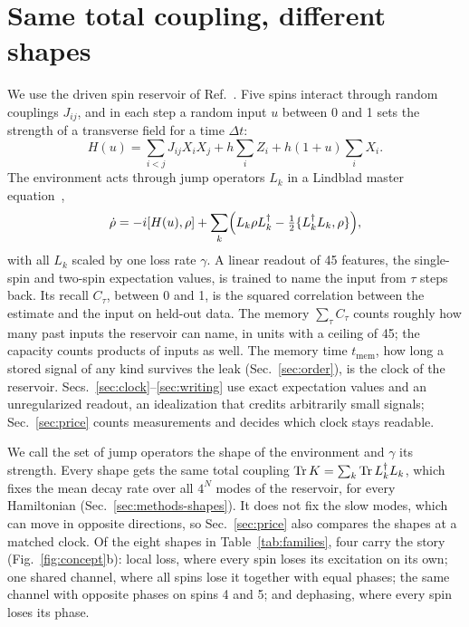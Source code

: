 \section{Same total coupling, different shapes}
\label{sec:shapes}
We use the driven spin reservoir of Ref.~\cite{Sannia2024}. Five spins interact through random couplings $J_{ij}$,
and in each step a random input $u$ between 0 and 1 sets the strength of a transverse field for a time $\Delta t$:
\begin{equation}
  H(u)=\sum_{i<j}J_{ij}X_iX_j+h\sum_iZ_i+h(1+u)\sum_iX_i .
  \label{eq:H}
\end{equation}
The environment acts through jump operators $L_k$ in a Lindblad master equation~\cite{Gorini1976,Lindblad1976},
\begin{equation}
  \dot\rho=-i[H(u),\rho]+\sum_k\Bigl(L_k\rho L_k^\dagger-\tfrac12\{L_k^\dagger L_k,\rho\}\Bigr),
  \label{eq:lindblad}
\end{equation}
with all $L_k$ scaled by one loss rate $\gamma$. A linear readout of 45 features, the single-spin and two-spin
expectation values, is trained to name the input from $\tau$ steps back. Its recall $C_\tau$, between 0 and 1, is the
squared correlation between the estimate and the input on held-out data. The memory $\sum_\tau C_\tau$ counts
roughly how many past inputs the reservoir can name, in units with a ceiling of 45; the capacity counts products of
inputs as well. The memory time $t_{\mathrm{mem}}$, how long a stored signal of any kind survives the leak
(Sec.~\ref{sec:order}), is the clock of the reservoir. Secs.~\ref{sec:clock}--\ref{sec:writing} use exact
expectation values and an unregularized readout, an idealization that credits arbitrarily small signals;
Sec.~\ref{sec:price} counts measurements and decides which clock stays readable.

We call the set of jump operators the shape of the environment and $\gamma$ its strength. Every shape gets the same
total coupling $\operatorname{Tr} K=\sum_k\operatorname{Tr} L_k^\dagger L_k$, which fixes the mean decay rate over all $4^N$ modes of the
reservoir, for every Hamiltonian (Sec.~\ref{sec:methods-shapes}). It does not fix the slow modes, which can move in
opposite directions, so Sec.~\ref{sec:price} also compares the shapes at a matched clock. Of the eight shapes in
Table~\ref{tab:families}, four carry the story (Fig.~\ref{fig:concept}b): local loss, where every spin loses its
excitation on its own; one shared channel, where all spins lose it together with equal phases; the same channel with
opposite phases on spins 4 and 5; and dephasing, where every spin loses its phase.

